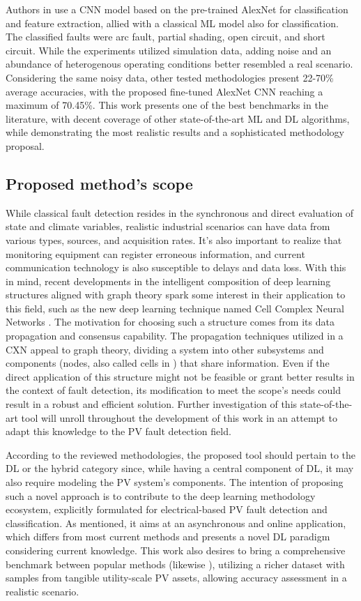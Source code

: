 Authors in \cite{Krizhevsky2012} use a CNN model based on the pre-trained AlexNet for classification and feature extraction, allied with a classical ML model also for classification. The classified faults were arc fault, partial shading, open circuit, and short circuit. While the experiments utilized simulation data, adding noise and an abundance of heterogenous operating conditions better resembled a real scenario. Considering the same noisy data, other tested methodologies present 22-70\% average accuracies, with the proposed fine-tuned AlexNet CNN reaching a maximum of 70.45\%. This work presents one of the best benchmarks in the literature, with decent coverage of other state-of-the-art ML and DL algorithms, while demonstrating the most realistic results and a sophisticated methodology proposal.

\subsection{Proposed method's scope}

While classical fault detection resides in the synchronous and direct evaluation of state and climate variables, realistic industrial scenarios can have data from various types, sources, and acquisition rates. It's also important to realize that monitoring equipment can register erroneous information, and current communication technology is also susceptible to delays and data loss. With this in mind, recent developments in the intelligent composition of deep learning structures aligned with graph theory spark some interest in their application to this field, such as the new deep learning technique named Cell Complex Neural Networks \cite{Hajij2020}. The motivation for choosing such a structure comes from its data propagation and consensus capability. The propagation techniques utilized in a CXN appeal to graph theory, dividing a system into other subsystems and components (nodes, also called cells in \cite{Hajij2020}) that share information. Even if the direct application of this structure might not be feasible or grant better results in the context of fault detection, its modification to meet the scope's needs could result in a robust and efficient solution. Further investigation of this state-of-the-art tool will unroll throughout the development of this work in an attempt to adapt this knowledge to the PV fault detection field.

According to the reviewed methodologies, the proposed tool should pertain to the DL or the hybrid category since, while having a central component of DL, it may also require modeling the PV system's components. The intention of proposing such a novel approach is to contribute to the deep learning methodology ecosystem, explicitly formulated for electrical-based PV fault detection and classification. As mentioned, it aims at an asynchronous and online application, which differs from most current methods and presents a novel DL paradigm considering current knowledge. This work also desires to bring a comprehensive benchmark between popular methods (likewise \cite{Aziz2020}), utilizing a richer dataset with samples from tangible utility-scale PV assets, allowing accuracy assessment in a realistic scenario.


